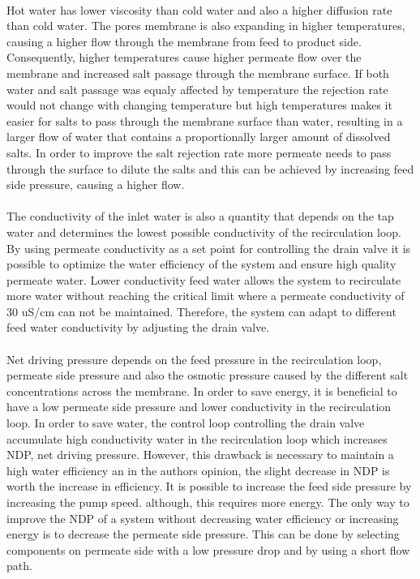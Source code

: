 \\
Hot water has lower viscosity than cold water and also a higher diffusion rate than cold water. The pores membrane is also expanding in higher temperatures, causing a higher flow through the membrane from feed to product side. Consequently, higher temperatures cause higher permeate flow over the membrane and increased salt passage through the membrane surface. If both water and salt passage was equaly affected by temperature the rejection rate would not change with changing temperature but high temperatures makes it easier for salts to pass through the membrane surface than water, resulting in a larger flow of water that contains a proportionally larger amount of dissolved salts. In order to improve the salt rejection rate more permeate needs to pass through the surface to dilute the salts and this can be achieved by increasing feed side pressure, causing a higher flow. \\
\\
The conductivity of the inlet water is also a quantity that depends on the tap water and determines the lowest possible conductivity of the recirculation loop. By using permeate conductivity as a set point for controlling the drain valve it is possible to optimize the water efficiency of the system and ensure high quality permeate water. Lower conductivity feed water allows the system to recirculate more water without reaching the critical limit where a permeate conductivity of 30 uS/cm can not be maintained. Therefore, the system can adapt to different feed water conductivity by adjusting the drain valve.\\
\\
Net driving pressure depends on the feed pressure in the recirculation loop, permeate side pressure and also the osmotic pressure caused by the different salt concentrations across the membrane. In order to save energy, it is beneficial to have a low permeate side pressure and lower conductivity in the recirculation loop. In order to save water, the control loop controlling the drain valve accumulate high conductivity water in the recirculation loop which increases NDP, net driving pressure. However, this drawback is necessary to maintain a high water efficiency an in the authors opinion, the slight decrease in NDP is worth the increase in efficiency. It is possible to increase the feed side pressure by increasing the pump speed. although, this requires more energy. The only way to improve the NDP of a system without decreasing water efficiency or increasing energy is to decrease the permeate side pressure. This can be done by selecting components on permeate side with a low pressure drop and by using a short flow path.


